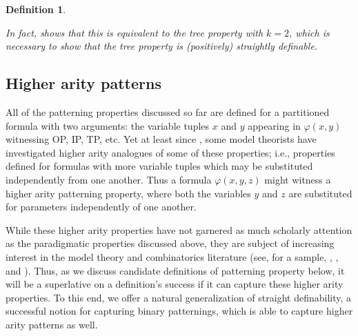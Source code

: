 \documentclass[10pt,a4paper]{amsart}
\newcommand{\vphi}{\varphi}
\newtheorem{definition}{Definition}
\begin{document}
\begin{definition}
\begin{center}
\begin{tikzpicture}
\end{tikzpicture}
\end{center}


In fact, \cite{shelah1990classification} shows that this is equivalent to the tree property with $k = 2$, which is necessary to show that the tree property is (positively) straightly definable.

\end{definition}


\subsection{Higher arity patterns}\label{higher arity pattern definitions section}

All of the patterning properties discussed so far are defined for a partitioned formula with two arguments: the variable tuples $x$ and $y$ appearing in $\vphi(x,y)$ witnessing OP, IP, TP, etc. Yet at least since \cite{shelah2007definable}, some model theorists have investigated higher arity analogues of some of these properties; i.e., properties defined for formulas with more variable tuples which may be substituted independently from one another. Thus a formula $\vphi(x,y,z)$ might witness a higher arity patterning property, where both the variables $y$ and $z$ are substituted for parameters independently of one another. 

While these higher arity properties have not garnered as much scholarly attention as the paradigmatic properties discussed above, they are subject of increasing interest in the model theory and combinatorics literature (see, for a sample, \cite{hempel2016n}, \cite{chernikov2020hypergraph}, and \cite{terry2021higher}). Thus, as we discuss candidate definitions of patterning property below, it will be a superlative on a definition's success if it can capture these higher arity properties. To this end, we offer a natural generalization of straight definability, a successful notion for capturing binary patternings, which is able to capture higher arity patterns as well.
\end{document}
